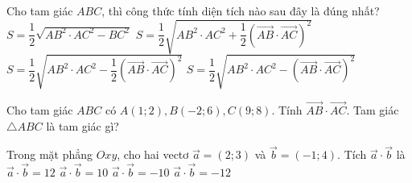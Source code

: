 \begin{ex}%
	Cho tam  giác $ABC$, thì công thức tính diện tích nào sau đây là đúng nhất?
	\choice 
		 {$S = \dfrac{1}{2}\sqrt{AB^2\cdot AC^2 - BC^2}$}
		{$S =  \dfrac{1}{2}\sqrt{AB^2\cdot AC^2 + \dfrac{1}{2}\left(\overrightarrow{AB}\cdot \overrightarrow{AC}\right)^2}$}
		{$S = \dfrac{1}{2}\sqrt{AB^2\cdot AC^2 -  \dfrac{1}{2}\left(\overrightarrow{AB}\cdot \overrightarrow{AC}\right)^2}$}
		{\True $S = \dfrac{1}{2}\sqrt{AB^2\cdot AC^2 -  \left(\overrightarrow{AB}\cdot \overrightarrow{AC}\right)^2}$}
\end{ex}

\begin{bt}%
	Cho tam giác $ABC$ có $A(1;2), B(-2;6), C(9;8)$. Tính $\overrightarrow{AB}\cdot \overrightarrow{AC}$. Tam giác $\triangle ABC$ là tam giác gì?
\end{bt}

\begin{ex}%
	Trong mặt phẳng $Oxy$, cho hai vectơ $\overrightarrow{a}=(2;3)$ và $\overrightarrow{b}=(-1;4)$. Tích $\overrightarrow{a}\cdot\overrightarrow{b}$ là
	\choice
		{$\overrightarrow{a}\cdot\overrightarrow{b}=12$}
		{\True $\overrightarrow{a}\cdot\overrightarrow{b}=10$}
		{$\overrightarrow{a}\cdot\overrightarrow{b}=-10$}
		{$\overrightarrow{a}\cdot\overrightarrow{b}=-12$}
\end{ex}

